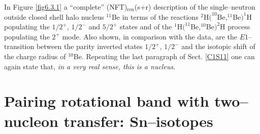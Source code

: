 In Figure \ref{fig6.3.1} a ``complete'' (NFT)$_{\text{ren}}$(s+r) description of the single--neutron outside closed shell halo nucleus $^{11}$Be in terms of the reactions $^2$H$(^{10}$Be,$^{11}$Be$ )^1$H populating the $1/2^+$, $1/2^-$ and $5/2^+$ states and of the $^1$H$(^{11}$Be,$^{10}$Be$)^2$H process populating the $2^+$ mode. Also shown, in comparison with the data, are the $E1$--transition between the parity inverted states $1/2^+$, $1/2^-$ and the isotopic shift of the charge radius of $^{10}$Be.  Repeating the last paragraph of Sect. \ref{C1S11} one can again state that, \textit{in a very real sense, this is a nucleus.} 
\section[Pairing rotational bands]{Pairing rotational band with two--nucleon transfer: Sn--isotopes}\label{C8S2}

